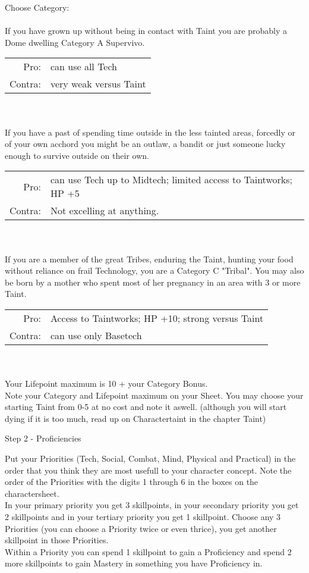 \documentclass{article}
\newcommand{\subhline}[1]{\begin{center}\large #1 \normalsize \end{center}}
\begin{document}
Choose Category:\\\\
If you have grown up without being in contact with Taint you are probably a Dome dwelling Category A Supervivo. \\
\begin{tabular}{rl}
Pro:&can use all Tech\\
Contra:&very weak versus Taint\\
\end{tabular}\\\\
If you have a past of spending time outside in the less tainted areas, forcedly or of your own acchord you might be an
outlaw, a bandit or just someone lucky enough to survive outside on their own.\\
\begin{tabular}{rl}
Pro:&can use Tech up to Midtech; limited access to Taintworks; HP +5\\
Contra:&Not excelling at anything.\\
\end{tabular}\\\\
If you are a member of the great Tribes, enduring the Taint, hunting your food without reliance on frail Technology, you
are a Category C "Tribal". You may also be born by a mother who spent most of her pregnancy in an area with 3 or more Taint.\\
\begin{tabular}{rl}
Pro:&Access to Taintworks; HP +10; strong versus Taint\\
Contra:&can use only Basetech\\
\end{tabular}\\\\

Your Lifepoint maximum is 10 + your Category Bonus.\\

Note your Category and Lifepoint maximum on your Sheet. You may choose your starting Taint from 0-5 at no cost and note 
it aswell. (although you will start dying if it is too much, read up on Charactertaint in the chapter Taint)\\

\subhline{Step 2 - Proficiencies}
Put your Priorities (Tech, Social, Combat, Mind, Physical and Practical) in the order that you think they are most
usefull to your character concept. Note the order of the Priorities with the digits 1 through 6 in the boxes on the charactersheet.\\
In your primary priority you get 3 skillpoints, in your secondary priority you get 2 skillpoints and in your tertiary
priority you get 1 skillpoint. Choose any 3 Priorities (you can choose a Priority twice or even thrice), you get another
skillpoint in those Priorities.\\
Within a Priority you can spend 1 skillpoint to gain a Proficiency and spend 2 more skillpoints to gain Mastery in
something you have Proficiency in.\\
\end{document}
